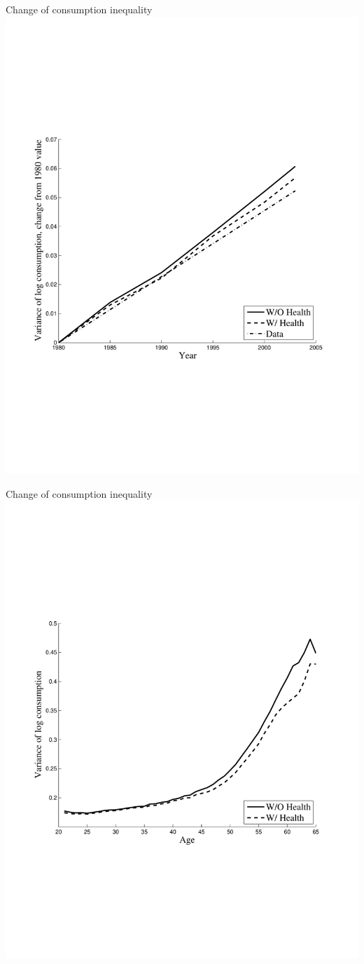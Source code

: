 \documentclass[svgnames]{beamer}
\begin{document}
\begin{frame}{Change of consumption inequality}
\includegraphics[width=1\textwidth, trim=0cm 0cm 0cm 5cm, clip=true]{graph/VarLogCByYear.pdf}
\end{frame}


\begin{frame}{Change of consumption inequality}
\includegraphics[width=1\textwidth, trim=0cm 0cm 0cm 5cm, clip=true]{graph/VarLogCByAge.pdf}
\end{frame}
\end{document}
